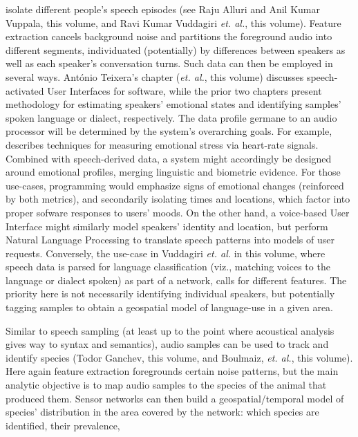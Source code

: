 {\begin{description}
isolate different people's speech episodes (see Raju Alluri 
and Anil Kumar Vuppala, this volume, and 
Ravi Kumar Vuddagiri \textit{et. al.}, this volume).  Feature 
extraction cancels background noise and partitions the foreground 
audio into different segments, individuated (potentially) by 
differences between speakers as well as each 
speaker's conversation turns.  Such data can 
then be employed in several ways.  Ant\'onio Teixera's chapter 
(\textit{et. al.}, this volume) discusses 
speech-activated User Interfaces for 
software, while the prior two chapters present methodology for 
estimating speakers' emotional states and 
identifying samples' spoken language or dialect, 
respectively.
\pseudoIndent{}
The data profile germane to 
an audio processor will be determined by the system's 
overarching goals.  For example, \cite{JongyoonChoi} describes 
techniques for measuring emotional stress via heart-rate signals.  
Combined with speech-derived data, a system might accordingly 
be designed around emotional profiles, merging linguistic and 
biometric evidence.  For those 
use-cases, programming would emphasize 
signs of emotional changes (reinforced by both metrics), 
and secondarily isolating times and locations, 
which factor into proper sofware responses to 
users' moods.  
\pseudoIndent{}
On the other hand, a voice-based 
User Interface might similarly model speakers' identity 
and location, but perform Natural Language Processing 
to translate speech patterns into models of user 
requests.  Conversely, the use-case in Vuddagiri 
\textit{et. al.} in this volume, where speech data is 
parsed for language classification (viz., matching voices to the 
language or dialect spoken) as part of a  network, 
calls for different features.    
The priority here is not necessarily identifying individual 
speakers, but potentially tagging samples to obtain a 
geospatial model of language-use in a given area. 
\item[Bioacoustic Sampling]  Similar to speech sampling 
(at least up to the point where acoustical analysis 
gives way to syntax and semantics), 
audio samples can be used to track and identify 
species (Todor Ganchev, this volume, and Boulmaiz, \textit{et. al.}, 
this volume).  Here again feature 
extraction foregrounds certain noise patterns, but the 
main analytic objective is to map audio samples to 
the species of the animal that produced them.  
Sensor networks can then build a geospatial/temporal 
model of species' distribution in the area covered by 
the network: which species are identified, their prevalence, 

\end{description}}
